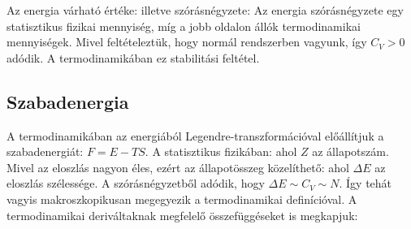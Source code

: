    Az energia várható értéke:
   illetve szórásnégyzete:
   Az energia szórásnégyzete egy statisztikus fizikai mennyiség, míg a jobb oldalon állók termodinamikai mennyiségek. Mivel feltételeztük, hogy normál rendszerben vagyunk, így $C_V>0$ adódik. A termodinamikában ez stabilitási feltétel.
   
  \subsection{Szabadenergia}
   
   A termodinamikában az energiából Legendre-transzformációval előállítjuk a szabadenergiát: $F=E-TS$. A statisztikus fizikában:
   ahol $Z$ az állapotszám. Mivel az eloszlás nagyon éles, ezért az állapotösszeg közelíthető:
   ahol $\Delta E$ az eloszlás szélessége. A szórásnégyzetből adódik, hogy $\Delta E\sim C_V\sim N$. Így tehát
   vagyis makroszkopikusan megegyezik a termodinamikai definícióval.
   A termodinamikai deriváltaknak megfelelő összefüggéseket is megkapjuk:
   
